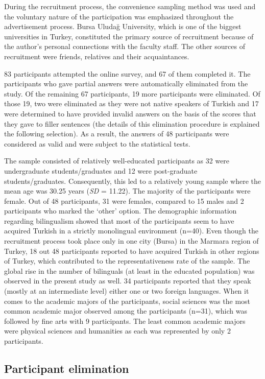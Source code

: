 During the recruitment process, the convenience sampling method was used and the voluntary nature of the participation was emphasized throughout the advertisement process. Bursa Uluda\u{g} University, which is one of the biggest universities in Turkey, constituted the primary source of recruitment because of the author's personal connections with the faculty staff. The other sources of recruitment were friends, relatives and their acquaintances. 

83 participants attempted the online survey, and 67 of them completed it. The participants who gave partial answers were automatically eliminated from the study. Of the remaining 67 participants, 19 more participants were eliminated. Of those 19, two were eliminated as they were not native speakers of Turkish and 17 were determined to have provided invalid answers on the basis of the scores that they gave to filler sentences (the details of this elimination procedure is explained the following selection). As a result, the answers of 48 participants were considered as valid and were subject to the statistical tests.

The sample consisted of relatively well-educated participants as 32 were undergraduate students/graduates and 12 were post-graduate students/graduates. Consequently, this led to a relatively young sample where the mean age was 30.25 years (\textit{SD} = 11.22). The majority of the participants were female. Out of 48 participants, 31 were females, compared to 15 males and 2 participants who marked the `other' option. The demographic information regarding bilingualism showed that most of the participants seem to have acquired Turkish in a strictly monolingual environment (n=40). Even though the recruitment process took place only in one city (Bursa) in the Marmara region of Turkey, 18 out 48 participants reported to have acquired Turkish in other regions of Turkey, which contributed to the representativeness rate of the sample. The global rise in the number of bilinguals (at least in the educated population) was observed in the present study as well. 34 participants reported that they speak (mostly at an intermediate level) either one or two foreign languages. When it comes to the academic majors of the participants, social sciences was the most common academic major observed among the participants (n=31), which was followed by fine arts with 9 participants. The least common academic majors were physical sciences and humanities as each was represented by only 2 participants.

\subsection{Participant elimination}

